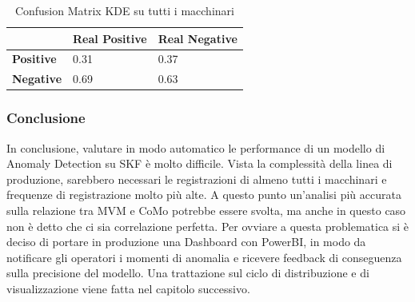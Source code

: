 \begin{table}[]
	\centering
	\begin{tabular}{|l|l|l|}
		\hline
		                  & \textbf{Real Positive} & \textbf{Real Negative} \\ \hline
		\textbf{Positive} & 0.31            & 0.37            \\ \hline
		\textbf{Negative} & 0.69            & 0.63            \\ \hline
	\end{tabular}
	\caption{\label{cm_quality_all}Confusion Matrix KDE su tutti i macchinari}
	
\end{table}

\subsubsection{Conclusione}
In conclusione, valutare in modo automatico le performance di un modello di Anomaly Detection su SKF è molto difficile. Vista la complessità della linea di produzione, sarebbero necessari le registrazioni di almeno tutti i macchinari e frequenze di registrazione molto più alte. A questo punto un'analisi più accurata sulla relazione tra MVM e CoMo potrebbe essere svolta, ma anche in questo caso non è detto che ci sia correlazione perfetta.
Per ovviare a questa problematica si è deciso di portare in produzione una Dashboard con PowerBI, in modo da notificare gli operatori i momenti di anomalia e ricevere feedback di conseguenza sulla precisione del modello.
Una trattazione sul ciclo di distribuzione e di visualizzazione viene fatta nel capitolo successivo.